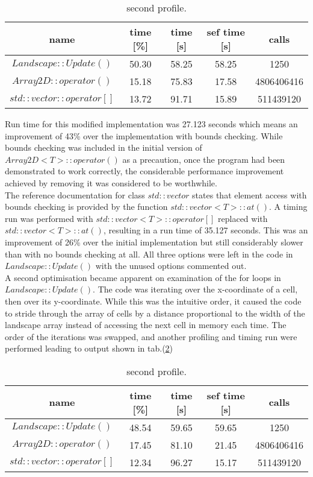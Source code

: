 \begin{table}
\caption{second profile.}
\label{tab: profile 2}
 \begin{center}
\begin{tabular}{|c|c|c|c|c|}
\hline
name & time [\%] & time [s] & sef time [s] & calls\\
\hline
$Landscape::Update()$ & 50.30 & 58.25 & 58.25 & 1250\\
\hline
$Array2D::operator()$& 15.18 & 75.83& 17.58 & 4806406416\\
\hline
$std::vector::operator[]$&13.72& 91.71 &15.89 & 511439120\\
\hline
\end{tabular}
\end{center}
\end{table}

Run time for this modified implementation was 27.123 seconds which means an improvement of 43\% over the implementation with bounds checking.
While bounds checking was included in the initial version of $Array2D<T>::operator()$ as a precaution, once the program had been demonstrated to work correctly, the considerable performance improvement achieved by removing it was considered to be worthwhile.\\
The reference documentation for class $std::vector$ states that element access with bounds checking is provided by the function $std::vector<T>::at()$.  A timing run was performed with $std::vector<T>::operator[]$ replaced with $std::vector<T>::at()$, resulting in a run time of 35.127 seconds.
This was an improvement of 26\% over the initial implementation but still considerably slower than with no bounds checking at all. 
All three options were left in the code in $Landscape::Update()$ with the unused options commented out.\\

A second optimisation became apparent on examination of the for loops in $Landscape::Update()$. The code was iterating over the x-coordinate of a cell, then over its y-coordinate.
While this was the intuitive order, it caused the code to stride through the array of cells by a distance proportional to the width of the landscape array instead of accessing the next cell in memory each time.
The order of the iterations was swapped, and another profiling and timing run were performed leading to output shown in tab.(\ref{tab: profile 3})


\begin{table}
\caption{second profile.}
\label{tab: profile 3}
 \begin{center}
\begin{tabular}{|c|c|c|c|c|}
\hline
name & time [\%] & time [s] & sef time [s] & calls\\
\hline
$Landscape::Update()$ & 48.54 & 59.65 & 59.65 &1250 \\
\hline
$Array2D::operator()$& 17.45& 81.10& 21.45 &4806406416 \\
\hline
$std::vector::operator[]$& 12.34& 96.27 &15.17 &511439120\\
\hline
\end{tabular}
\end{center}
\end{table}

